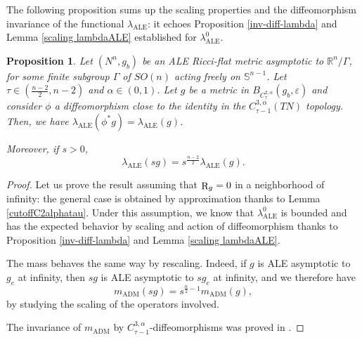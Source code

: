 \documentclass[a4paper,11pt,reqno]{amsart}
\newtheorem{prop}[defn]{Proposition}
\def\RR{\mathbb{R}}
\def\R{\mathop{\rm R}\nolimits}
\numberwithin{equation}{section}
\begin{document}
	The following proposition sums up the scaling properties and the diffeomorphism invariance of the functional $\lambda_{\operatorname{ALE}}$: it echoes Proposition \ref{inv-diff-lambda} and Lemma \ref{scaling lambdaALE} established for $\lambda_{\operatorname{ALE}}^0$.
	\begin{prop}\label{scaling diffeo tildelambda}
		Let $(N^n,g_b)$ be an ALE Ricci-flat metric asymptotic to $\RR^n\slash\Gamma$, for some finite subgroup $\Gamma$ of $SO(n)$ acting freely on $\mathbb{S}^{n-1}$. Let $\tau\in\left(\frac{n-2}{2},n-2\right)$ and $\alpha\in (0,1)$.
		Let $g$ be a metric in $B_{C^{2,\alpha}_{\tau}}(g_b,\varepsilon)$ and consider $\phi$ a diffeomorphism close to the identity in the $C^{3,\alpha}_{\tau-1}(TN)$ topology. Then, we have $\lambda_{\operatorname{ALE}}(\phi^*g) = \lambda_{\operatorname{ALE}}(g)$.
		
		Moreover, if $s>0$,
		$$\lambda_{\operatorname{ALE}}(sg) = s^{\frac{n-2}{2}}\lambda_{\operatorname{ALE}}(g).$$
	\end{prop}
	\begin{proof}
		Let us prove the result assuming that $\R_g=0$ in a neighborhood of infinity: the general case is obtained by approximation thanks to Lemma \ref{cutoffC2alphatau}. Under this assumption, we know that $\lambda_{\operatorname{ALE}}^0$ is bounded and has the expected behavior by scaling and action of diffeomorphism thanks to Proposition \ref{inv-diff-lambda} and Lemma \ref{scaling lambdaALE}.
		
		The mass behaves the same way by rescaling. Indeed, if $g$ is ALE asymptotic to $g_e$ at infinity, then $sg$ is ALE asymptotic to $sg_e$ at infinity, and we therefore have 
		$$m_{\operatorname{ADM}}(sg) = s^{\frac{n}{2}- 1} m_{\operatorname{ADM}}(g),$$
		by studying the scaling of the operators involved.
		
		The invariance of $m_{\operatorname{ADM}}$ by $C^{3,\alpha}_{\tau-1}$-diffeomorphisms was proved in \cite{Bart-Mass}.
	\end{proof}
	
\end{document}
